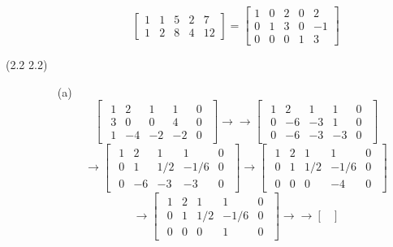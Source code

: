 \begin{description}
\begin{itemize}
$$\begin{bmatrix}
1 & 1 & 5 & 2 & 7 \\
1 & 2 & 8 & 4 & 12
\end{bmatrix} = \begin{bmatrix}
1 & 0 & 2 & 0 & 2 \\
0 & 1 & 3 & 0 & -1 \\
0 & 0 & 0 & 1 & 3
\end{bmatrix}$$
\end{itemize}
\item[(2.2 {\color{cBlue}2.2})]
\begin{itemize}
\item[(a)]
$$\begin{bmatrix}
\begin{array}{cccc|c}
1 & 2 & 1 & 1 & 0 \\
3 & 0 & 0 & 4 & 0 \\
1 & -4 & -2 & -2 & 0
\end{array}
\end{bmatrix} \rightarrow\rightarrow \begin{bmatrix}
\begin{array}{cccc|c}
1 & 2 & 1 & 1 & 0 \\
0 & -6 & -3 & 1 & 0 \\
0 & -6 & -3 & -3 & 0
\end{array}
\end{bmatrix}$$
$$ \rightarrow \begin{bmatrix}
\begin{array}{cccc|c}
1 & 2 & 1 & 1 & 0 \\
0 & 1 & 1/2 & -1/6 & 0 \\
0 & -6 & -3 & -3 & 0
\end{array}
\end{bmatrix} \rightarrow \begin{bmatrix}
\begin{array}{cccc|c}
1 & 2 & 1 & 1 & 0 \\
0 & 1 & 1/2 & -1/6 & 0 \\
0 & 0 & 0 & -4 & 0
\end{array}
\end{bmatrix}$$
$$\rightarrow \begin{bmatrix}
\begin{array}{cccc|c}
1 & 2 & 1 & 1 & 0 \\
0 & 1 & 1/2 & -1/6 & 0 \\
0 & 0 & 0 & 1 & 0
\end{array}
\end{bmatrix}\rightarrow\rightarrow \begin{bmatrix}

\end{bmatrix}$$
\end{itemize}
\end{description}
